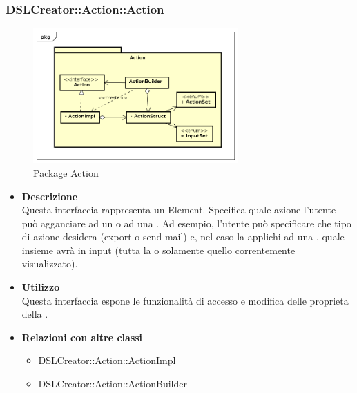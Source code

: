  \subsubsection{DSLCreator::Action::Action}
                 \begin{figure}[H]
                  \centering
                  \includegraphics[width=0.7\textwidth]{res/img/Action.png}
                  \caption{Package Action}
                  \label{fig:diagram_model}
                \end{figure}
                    \begin{itemize}
                        \item \textbf{Descrizione} \hfill \\
                          Questa interfaccia rappresenta un  Element. Specifica quale azione l'utente può agganciare ad un  o ad una . Ad esempio, l'utente può specificare che tipo di azione desidera (export o send mail) e, nel caso la applichi ad una , quale insieme avrà in input (tutta la  o solamente quello correntemente visualizzato).
                        \item \textbf{Utilizzo} \hfill \\
                          Questa interfaccia espone le funzionalità di accesso e modifica delle proprieta della .
                        \item \textbf{Relazioni con altre classi}
                            \begin{itemize}
                              \item DSLCreator::Action::ActionImpl
                              \item DSLCreator::Action::ActionBuilder
                            \end{itemize}
                    \end{itemize}  

